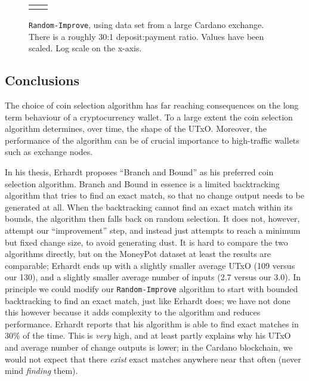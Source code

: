 \documentclass{article}
\theoremstyle{definition}{
  \newtheorem{lemma}{Lemma}[section] %
  \newtheorem{definition}[lemma]{Definition}
}
\theoremstyle{theorem}{
  \newtheorem{invariant}[lemma]{Invariant}
  \newtheorem{proofobligation}[lemma]{Proof Obligation}
}
\numberwithin{equation}{lemma}
\begin{document}
\begin{figure}[p]
\begin{center}
\scriptsize
\begin{tabular}{ll}
 &

\end{tabular}
\end{center}
\caption{\label{fig:inputselection:CardanoExchange_randomOn}
  \texttt{Random-Improve}, using data set from a large Cardano exchange.
  There is a roughly 30:1 deposit:payment ratio. Values have been scaled.
  Log scale on the x-axis.
}
\end{figure}


\subsection{Conclusions}

The choice of coin selection algorithm has far reaching consequences on the long
term behaviour of a cryptocurrency wallet. To a large extent the coin selection
algorithm determines, over time, the shape of the UTxO. Moreover, the performance
of the algorithm can be of crucial importance to high-traffic wallets such as
exchange nodes.

In his thesis, Erhardt proposes ``Branch and Bound'' as his preferred coin
selection algorithm. Branch and Bound in essence is a limited backtracking
algorithm that tries to find an exact match, so that no change output needs
to be generated at all. When the backtracking cannot find an exact match within
its bounds, the algorithm then falls back on random selection. It does not,
however, attempt our ``improvement'' step, and instead just attempts to reach
a minimum but fixed change size, to avoid generating dust. It is hard to compare
the two algorithms directly, but on the MoneyPot dataset at least the results
are comparable; Erhardt ends up with a slightly smaller average UTxO (109
versus our 130), and a slightly smaller average number of inputs (2.7 versus
our 3.0). In principle we could modify our \texttt{Random-Improve} algorithm to
start with bounded backtracking to find an exact match, just like Erhardt does;
we have not done this however because it adds complexity to the algorithm and
reduces performance. Erhardt reports that his algorithm is able to find
exact matches in 30\% of the time. This is \emph{very} high, and at least partly
explains why his UTxO and average number of change outputs is lower; in the
Cardano blockchain, we would not expect that there \emph{exist} exact matches
anywhere near that often (never mind \emph{finding} them).
\end{document}
